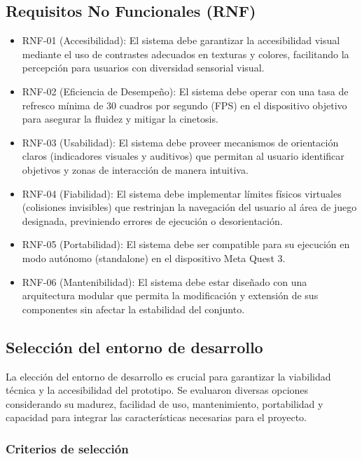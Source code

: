 \subsection{Requisitos No Funcionales (RNF)}
\begin{itemize}
  \item RNF-01 (Accesibilidad): El sistema debe garantizar la accesibilidad visual mediante el uso de contrastes adecuados en texturas y colores, facilitando la percepción para usuarios con diversidad sensorial visual.
  \item RNF-02 (Eficiencia de Desempeño): El sistema debe operar con una tasa de refresco mínima de 30 cuadros por segundo (FPS) en el dispositivo objetivo para asegurar la fluidez y mitigar la cinetosis.
  \item RNF-03 (Usabilidad): El sistema debe proveer mecanismos de orientación claros (indicadores visuales y auditivos) que permitan al usuario identificar objetivos y zonas de interacción de manera intuitiva.
  \item RNF-04 (Fiabilidad): El sistema debe implementar límites físicos virtuales (colisiones invisibles) que restrinjan la navegación del usuario al área de juego designada, previniendo errores de ejecución o desorientación.
  \item RNF-05 (Portabilidad): El sistema debe ser compatible para su ejecución en modo autónomo (standalone) en el dispositivo Meta Quest 3.
  \item RNF-06 (Mantenibilidad): El sistema debe estar diseñado con una arquitectura modular que permita la modificación y extensión de sus componentes sin afectar la estabilidad del conjunto.
\end{itemize}

\subsection{Selección del entorno de desarrollo} \label{sec:seleccion-desarrollo}

La elección del entorno de desarrollo es crucial para garantizar la viabilidad técnica y la accesibilidad del prototipo. 
Se evaluaron diversas opciones considerando su madurez, facilidad de uso, mantenimiento, portabilidad y capacidad para 
integrar las características necesarias para el proyecto.

\subsubsection{Criterios de selección}

